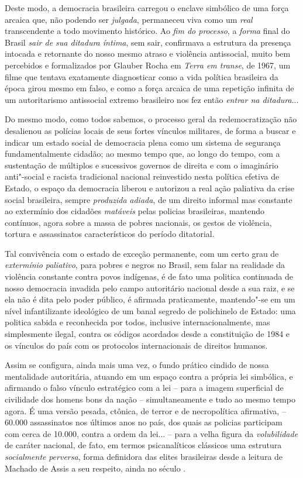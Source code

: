Deste modo, a democracia brasileira carregou o enclave simbólico de uma
força arcaica que, não podendo ser \emph{julgada}, permaneceu viva como
um \emph{real} transcendente a todo movimento histórico. Ao \emph{fim do
processo}, a \emph{forma} final do Brasil \emph{sair de sua ditadura
íntima}, sem sair, confirmava a estrutura da presença intocada e
retornante do nosso mesmo atraso e violência antissocial, muito bem
percebidos e formalizados por Glauber Rocha em \emph{Terra em transe},
de 1967, um filme que tentava exatamente diagnosticar como a vida
política brasileira da época girou mesmo em falso, e como a força
arcaica de uma repetição infinita de um autoritarismo antissocial
extremo brasileiro nos fez então \emph{entrar na ditadura}...

Do mesmo modo, como todos sabemos, o processo geral da redemocratização
não desalienou as polícias locais de seus fortes vínculos militares, de
forma a buscar e indicar um estado social de democracia plena como um
sistema de segurança fundamentalmente cidadão; ao mesmo tempo que, ao
longo do tempo, com a sustentação de múltiplos e sucessivos governos de
direita e com o imaginário anti"-social e racista tradicional nacional
reinvestido nesta política efetiva de Estado, o espaço da democracia
liberou e autorizou a real ação paliativa da crise social brasileira,
sempre \emph{produzida} \emph{adiada}, de um direito informal mas
constante ao extermínio dos cidadões \emph{matáveis} pelas policias
brasileiras, mantendo contínuos, agora sobre a massa de pobres
nacionais, os gestos de violência, tortura e assassinatos
característicos do período ditatorial.

Tal convivência com o estado de exceção permanente, com um certo grau de
\emph{extermínio} \emph{paliativo}, para pobres e negros no Brasil, sem
falar na realidade da violência constante contra povos indígenas, é de
fato uma politica continuada de nosso democracia invadida pelo campo
autoritário nacional desde a sua raiz, e se ela não é dita pelo poder
público, é afirmada praticamente, mantendo"-se em um nível infantilizante
ideológico de um banal segredo de polichinelo de Estado: uma politica
sabida e reconhecida por todos, inclusive internacionalmente, mas
simplesmente ilegal, contra os códigos acordados desde a constituição de
1984 e os vínculos do país com os protocolos internacionais de direitos
humanos.

Assim se configura, ainda mais uma vez, o fundo prático cindido de nossa
mentalidade autoritária, atuando em um espaço contra a própria lei
simbólica, e afirmando o falso vínculo estratégico com a lei -- para a
imagem superficial de civilidade dos homens bons da nação --
simultaneamente e tudo ao mesmo tempo agora. É uma versão pesada,
ctônica, de terror e de necropolítica afirmativa, -- 60.000 assassinatos
nos últimos anos no país, dos quais as policias participam com cerca de
10.000, contra a ordem da lei... -- para a velha figura da
\emph{volubilidade} de caráter nacional, de fato, em termos
psicanalíticos clássicos uma estrutura \emph{socialmente}
\emph{perversa}, forma definidora das elites brasileiras desde a leitura
de Machado de Assis a seu respeito, ainda no século .

